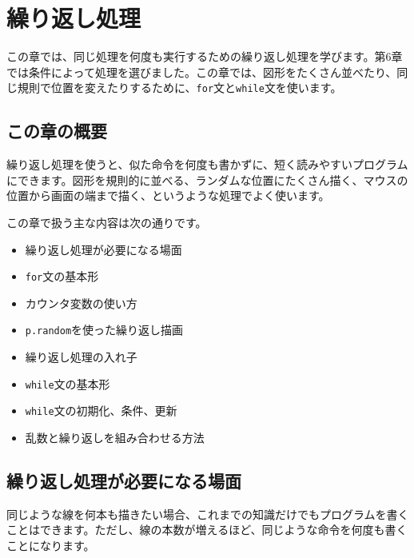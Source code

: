 \chapter{繰り返し処理}
\label{chap:loops}

この章では、同じ処理を何度も実行するための繰り返し処理を学びます。第6章では条件によって処理を選びました。この章では、図形をたくさん並べたり、同じ規則で位置を変えたりするために、\texttt{for}文と\texttt{while}文を使います。

\section{この章の概要}

繰り返し処理を使うと、似た命令を何度も書かずに、短く読みやすいプログラムにできます。図形を規則的に並べる、ランダムな位置にたくさん描く、マウスの位置から画面の端まで描く、というような処理でよく使います。

この章で扱う主な内容は次の通りです。

\begin{itemize}
    \item 繰り返し処理が必要になる場面
    \item \texttt{for}文の基本形
    \item カウンタ変数の使い方
    \item \texttt{p.random}を使った繰り返し描画
    \item 繰り返し処理の入れ子
    \item \texttt{while}文の基本形
    \item \texttt{while}文の初期化、条件、更新
    \item 乱数と繰り返しを組み合わせる方法
\end{itemize}

\section{繰り返し処理が必要になる場面}

同じような線を何本も描きたい場合、これまでの知識だけでもプログラムを書くことはできます。ただし、線の本数が増えるほど、同じような命令を何度も書くことになります。

\begin{listing}[htbp]
\inputminted{ts}{typescript-p5/listings/chapter07/repeated-lines-without-loop.ts}
\caption{繰り返し処理を使わずに線を並べる（\texttt{chapter07/repeated-lines-without-loop.ts}）}
\label{lst:chapter07-repeated-lines-without-loop}
\end{listing}

